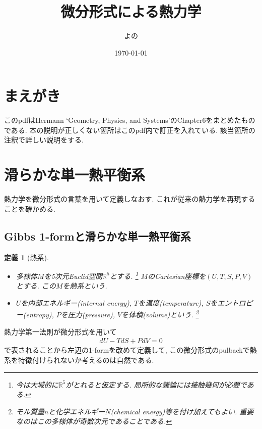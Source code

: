 \documentclass[a4paper,12pt]{ltjsarticle}
\title{微分形式による熱力学}
\author{よの}
\date{\today}
\theoremstyle{break}
\newtheorem{defn}[thm]{定義}
\newcommand{\mbr}{\mathbb{R}}
\numberwithin{equation}{section}
\begin{document}
\maketitle

\newpage

\section*{まえがき}

このpdfはHermann `Geometry, Physics, and Systems'のChapter6をまとめたものである. 
本の説明が正しくない箇所はこのpdf内で訂正を入れている. 
該当箇所の注釈で詳しい説明をする. 

\newpage

\tableofcontents

\newpage

\section{滑らかな単一熱平衡系}

熱力学を微分形式の言葉を用いて定義しなおす. 
これが従来の熱力学を再現することを確かめる. 

\subsection{Gibbs 1-formと滑らかな単一熱平衡系}

\begin{defn}[熱系]
  \begin{itemize}
    \item 多様体$M$を5次元Euclid空間$\mbr^5$とする. 
    \footnote{
      今は大域的に$\mbr^5$がとれると仮定する. 
      局所的な議論には接触幾何が必要である. 
    }
    $M$のCartesian座標を$(U,T,S,P,V)$とする. 
    この$M$を熱系という.
    \item $U$を内部エネルギー(internal energy), $T$を温度(temperature), $S$をエントロピー(entropy), $P$を圧力(pressure), $V$を体積(volume)という. 
    \footnote{モル質量$n$と化学エネルギー$N$(chemical energy)等を付け加えてもよい. 
    重要なのはこの多様体が奇数次元であることである.}
  \end{itemize} 
\end{defn}

熱力学第一法則が微分形式を用いて
\begin{align*}
  dU - TdS + PdV 
  = 0
\end{align*}
で表されることから左辺の1-formを改めて定義して, この微分形式のpulbackで熱系を特徴付けられないか考えるのは自然である. 
\end{document}
